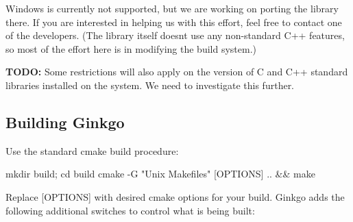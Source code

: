 Windows is currently not supported, but we are working on porting the library there. If you are interested in helping us with this effort, feel free to contact one of the developers. (The library itself doesn\textquotesingle{}t use any non-\/standard C++ features, so most of the effort here is in modifying the build system.)

{\bfseries T\+O\+DO\+:} Some restrictions will also apply on the version of C and C++ standard libraries installed on the system. We need to investigate this further.

\subsection*{Building Ginkgo }

Use the standard cmake build procedure\+:


\begin{DoxyCode}
mkdir build; cd build
cmake -G "Unix Makefiles" [OPTIONS] .. && make
\end{DoxyCode}


Replace {\ttfamily \mbox{[}O\+P\+T\+I\+O\+NS\mbox{]}} with desired cmake options for your build. Ginkgo adds the following additional switches to control what is being built\+:


